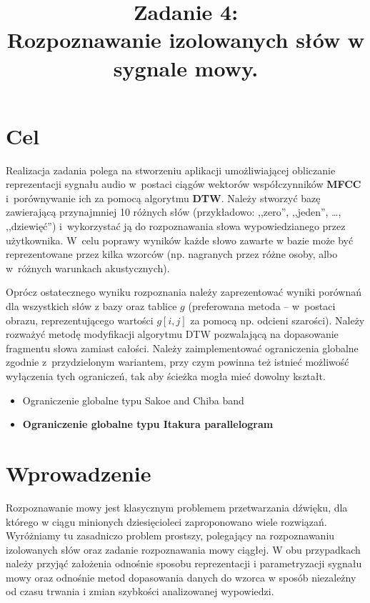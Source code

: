 \documentclass{classrep}
\author{
  \studentinfo{Paweł Musiał}{178726} \and
  \studentinfo{Łukasz Michalski}{178724}
}
\title{Zadanie 4:\\  \textbf {Rozpoznawanie izolowanych słów w sygnale mowy.}}
\begin{document}
\maketitle

\addtocounter{footnote}{1}

\tableofcontents
\pagebreak
\section{Cel}
Realizacja zadania polega na stworzeniu aplikacji umożliwiającej obliczanie reprezentacji sygnału audio w~postaci ciągów wektorów współczynników \textbf{MFCC} i~porównywanie ich za pomocą algorytmu \textbf{DTW}. Należy stworzyć bazę zawierającą przynajmniej 10 różnych słów (przykładowo: ,,zero'', ,,jeden'', …, ,,dziewięć'') i~wykorzystać ją do rozpoznawania słowa wypowiedzianego przez użytkownika. W~celu poprawy wyników każde słowo zawarte w bazie może być reprezentowane przez kilka wzorców (np. nagranych przez różne osoby, albo w~różnych warunkach akustycznych).

Oprócz ostatecznego wyniku rozpoznania należy zaprezentować wyniki porównań dla wszystkich słów z bazy oraz tablice $g$ (preferowana metoda – w~postaci obrazu, reprezentującego wartości $g[i, j]$ za pomocą np. odcieni szarości). Należy rozważyć metodę modyfikacji algorytmu DTW pozwalającą na dopasowanie fragmentu słowa zamiast całości. Należy zaimplementować ograniczenia globalne zgodnie z~przydzielonym wariantem, przy czym powinna też istnieć możliwość wyłączenia tych ograniczeń, tak aby ścieżka mogła mieć dowolny kształt.
\begin{itemize}
\item Ograniczenie globalne typu Sakoe and Chiba band
\item \textbf{Ograniczenie globalne typu Itakura parallelogram}
\end{itemize}
\section{Wprowadzenie}
Rozpoznawanie mowy jest klasycznym problemem przetwarzania dźwięku, dla którego w ciągu minionych dziesięcioleci zaproponowano wiele rozwiązań. Wyróżniamy tu zasadniczo problem prostszy, polegający na rozpoznawaniu izolowanych słów oraz zadanie rozpoznawania mowy ciągłej. W obu przypadkach należy przyjąć założenia odnośnie sposobu reprezentacji i parametryzacji sygnału mowy oraz odnośnie metod dopasowania danych do wzorca w sposób niezależny od czasu trwania i zmian szybkości analizowanej wypowiedzi.
\end{document}
